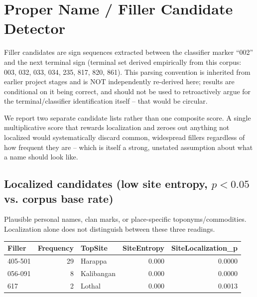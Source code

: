 \section{Proper Name / Filler Candidate Detector}

Filler candidates are sign sequences extracted between the classifier marker
``002'' and the next terminal sign (terminal set derived empirically from
this corpus: 003, 032, 033, 034, 235, 817, 820, 861). This parsing
convention is inherited from earlier project stages and is NOT independently
re-derived here; results are conditional on it being correct, and should not
be used to retroactively argue for the terminal/classifier identification
itself -- that would be circular.

We report two separate candidate lists rather than one composite score. A
single multiplicative score that rewards localization and zeroes out
anything not localized would systematically discard common, widespread
fillers regardless of how frequent they are -- which is itself a strong,
unstated assumption about what a name should look like.

\subsection{Localized candidates (low site entropy, $p<0.05$ vs. corpus base rate)}
Plausible personal names, clan marks, or place-specific toponyms/commodities.
Localization alone does not distinguish between these three readings.
\begin{tabular}{lrlrr}
\toprule
\textbf{Filler} & \textbf{Frequency} & \textbf{TopSite} & \textbf{SiteEntropy} & \textbf{SiteLocalization\_p} \\
\midrule
405-501 & 29 & Harappa & 0.000 & 0.0000 \\
056-091 & 8 & Kalibangan & 0.000 & 0.0000 \\
617 & 2 & Lothal & 0.000 & 0.0013 \\
\bottomrule
\end{tabular}

